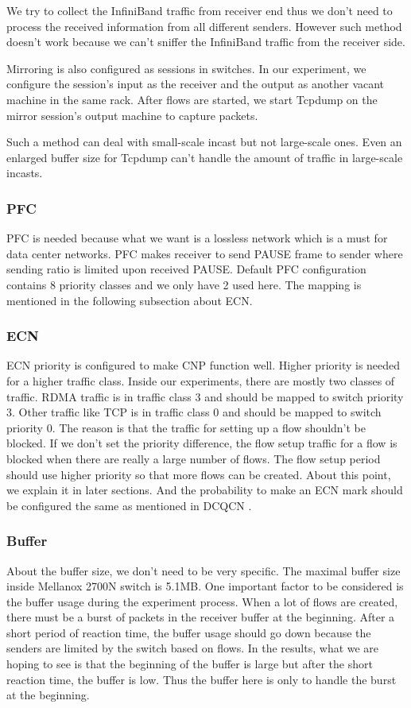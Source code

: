 \documentclass[12pt,a4paper]{article}
\begin{document}
We try to collect the InfiniBand traffic from
receiver end thus we don't need to process the received information from all different senders.
However such method doesn't work because we can't sniffer the InfiniBand traffic from the receiver side.

Mirroring is also configured as sessions in switches.
In our experiment, we configure the session's input as the receiver and the output as another vacant machine in the same rack.
After flows are started, we start Tcpdump on the mirror session's output machine to capture packets.

Such a method can deal with small-scale incast but not large-scale ones.
Even an enlarged buffer size for Tcpdump can't handle the amount of traffic in large-scale incasts.

\subsubsection{PFC}
PFC is needed because what we want is a lossless network which is a must for data center networks.
PFC makes receiver to send PAUSE frame to sender where sending ratio is limited upon received PAUSE.
Default PFC configuration contains 8 priority classes and we only have 2 used here.
The mapping is mentioned in the following subsection about ECN.

\subsubsection{ECN}
ECN priority is configured to make CNP function well. Higher priority is needed for a higher traffic class.
Inside our experiments, there are mostly two classes of traffic. RDMA traffic is in traffic class 3 and should be mapped to switch priority 3.
Other traffic like TCP is in traffic class 0 and should be mapped to switch priority 0.
The reason is that the traffic for setting up a flow shouldn't be blocked. If we don't set the priority difference, the flow setup traffic for a flow
is blocked when there are really a large number of flows. The flow setup period should use higher priority so that more flows can be created.
About this point, we explain it in later sections.
And the probability to make an ECN mark should be configured the same as mentioned in DCQCN \cite{dcqcn}.

\subsubsection{Buffer}
About the buffer size, we don't need to be very specific. The maximal buffer size inside Mellanox 2700N switch is 5.1MB.
One important factor to be considered is the buffer usage during the experiment process.
When a lot of flows are created, there must be a burst of packets in the receiver buffer at the beginning.
After a short period of reaction time, the buffer usage should go down because the senders are limited by the switch based on flows.
In the results, what we are hoping to see is that the beginning of the buffer is large but after the short reaction time, the buffer is low.
Thus the buffer here is only to handle the burst at the beginning.
\end{document}
